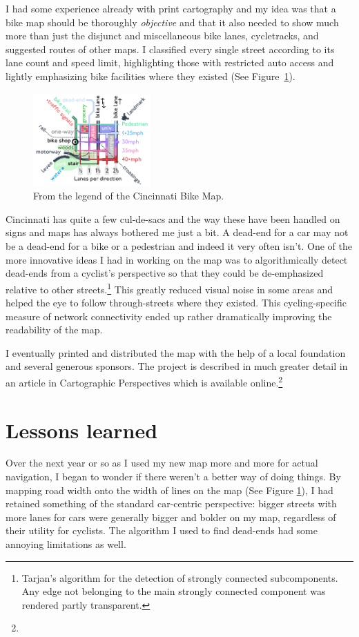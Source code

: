 \documentclass{article}
\begin{document}
		I had some experience already with print cartography and my idea was that a bike map should be thoroughly \textit{objective} and that it also needed to show much more than just the disjunct and miscellaneous bike lanes, cycletracks, and suggested routes of other maps. I classified every single street according to its lane count and speed limit, highlighting those with restricted auto access and lightly emphasizing bike facilities where they existed (See Figure~\ref{fig:legend}). 
		
		\begin{figure}[h!]
			\centering
			\includegraphics[width=0.4\textwidth]{legend}
			\caption{From the legend of the Cincinnati Bike Map.}
			\label{fig:legend}
		\end{figure}
		
		Cincinnati has quite a few cul-de-sacs and the way these have been handled on signs and maps has always bothered me just a bit. A dead-end for a car may not be a dead-end for a bike or a pedestrian and indeed it very often isn't.
		One of the more innovative ideas I had in working on the map was to algorithmically detect dead-ends from a cyclist's perspective so that they could be de-emphasized relative to other streets.\footnote{
			Tarjan's algorithm for the detection of strongly connected subcomponents. Any edge not belonging to the main strongly connected component was rendered partly transparent.
		} This greatly reduced visual noise in some areas and helped the eye to follow through-streets where they existed.
		This cycling-specific measure of network connectivity ended up rather dramatically improving the readability of the map. 
		
		I eventually printed and distributed the map with the help of a local foundation and several generous sponsors. The project is described in much greater detail in an article in Cartographic Perspectives which is available online.\footnote{}
	
	\section*{Lessons learned}
		Over the next year or so as I used my new map more and more for actual navigation, I began to wonder if there weren't a better way of doing things. By mapping road width onto the width of lines on the map (See Figure \ref{fig:legend}), I had retained something of the standard car-centric perspective: bigger streets with more lanes for cars were generally bigger and bolder on my map, regardless of their utility for cyclists. The algorithm I used to find dead-ends had some annoying limitations as well.
		
\end{document}
